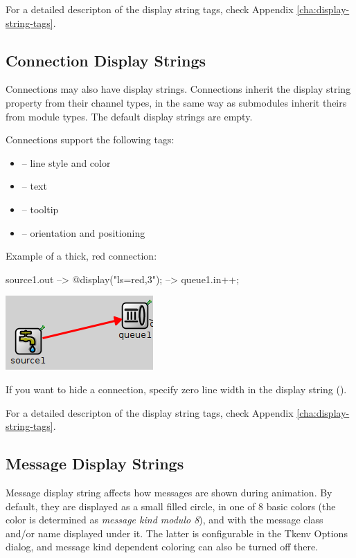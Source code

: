 For a detailed descripton of the display string tags, check
Appendix \ref{cha:display-string-tags}.

\subsection{Connection Display Strings}

Connections may also have display strings. Connections inherit the
display string property from their channel types, in the same way as
submodules inherit theirs from module types. The default display
strings are empty.

Connections support the following tags:
\begin{itemize}
  \item{ -- line style and color}
  \item{ -- text}
  \item{ -- tooltip}
  \item{ -- orientation and positioning}
\end{itemize}

Example of a thick, red connection:
\begin{ned}
source1.out --> { @display("ls=red,3"); } --> queue1.in++;
\end{ned}

\begin{center}
\includegraphics{figures/graphics-lstag}
\end{center}

\begin{note}
If you want to hide a connection, specify zero line width in the display
string ().
\end{note}

For a detailed descripton of the display string tags, check
Appendix \ref{cha:display-string-tags}.

\subsection{Message Display Strings}

Message display string affects how messages are shown during animation.
By default, they are displayed as a small filled circle, in one of
8 basic colors (the color is determined as \textit{message kind modulo 8}),
and with the message class and/or name displayed under it.
The latter is configurable in the Tkenv Options dialog, and message kind
dependent coloring can also be turned off there.

